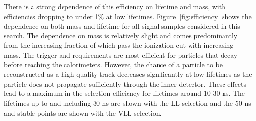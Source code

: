 There is a strong dependence of this efficiency on lifetime and mass, with efficiencies dropping to under 1\% at low lifetimes.
Figure~\ref{fig:efficiency} shows the dependence on both mass and lifetime for all signal samples considered in this search.
The dependence on mass is relatively slight and comes predominantly from the increasing fraction of \rhadrons which pass the ionization cut with increasing mass.
The trigger and \met requirements are most efficient for particles that decay before reaching the calorimeters.
However, the chance of a particle to be reconstructed as a high-quality track decreases significantly at low lifetimes as the particle does not propagate sufficiently through the inner detector.
These effects lead to a maximum in the selection efficiency for lifetimes around 10-30 ns.
The lifetimes up to and including 30 ns are shown with the \ac{LL} selection and the 50 ns and stable points are shown with the \ac{VLL} selection.

